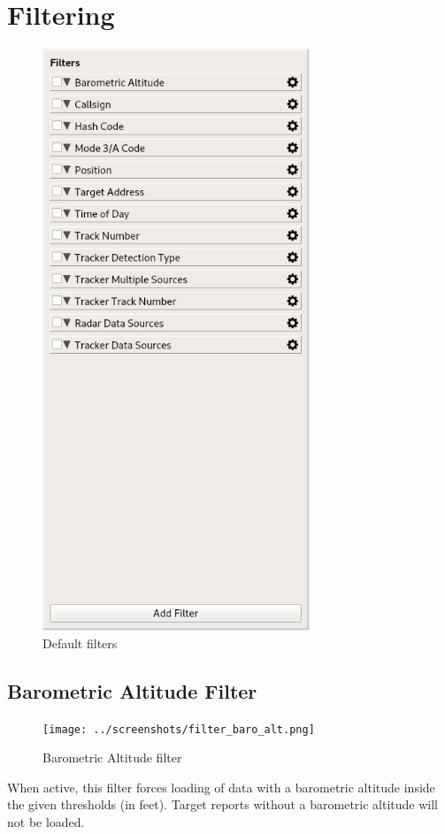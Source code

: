 \section{Filtering}
\label{sec:filtering}

\begin{figure}[H]
  \center
    \includegraphics[width=8cm,frame]{../screenshots/load_filters.png}
  \caption{Default filters}
\end{figure}

\subsection{Barometric Altitude Filter}

\begin{figure}[H]
  \center
    \texttt{[image: ../screenshots/filter\_baro\_alt.png]}
  \caption{Barometric Altitude filter}
\end{figure}

When active, this filter forces loading of data with a barometric altitude inside the given thresholds (in feet). Target reports without a barometric altitude will not be loaded.

